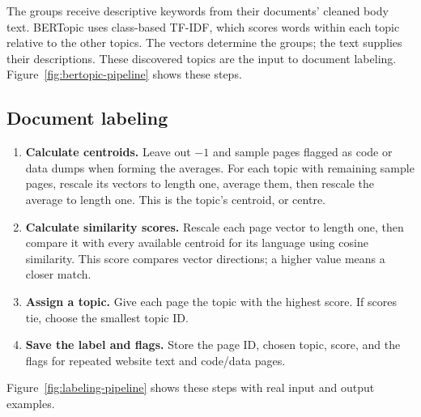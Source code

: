 The groups receive descriptive keywords from their documents' cleaned body text. BERTopic
uses class-based TF-IDF, which scores words within each topic relative to the other topics.
The vectors determine the groups; the text supplies their descriptions. These discovered
topics are the input to document labeling. Figure~\ref{fig:bertopic-pipeline} shows these steps.



\clearpage
\subsection{Document labeling}
\label{sec:method-coverage}

\begin{enumerate}[leftmargin=*,itemsep=0.4em]
\item \textbf{Calculate centroids.} Leave out $-1$ and sample pages flagged as code or data
dumps when forming the averages. For each topic with remaining sample pages, rescale its
vectors to length one, average them, then rescale the average to length one. This is the
topic's centroid, or centre.
\item \textbf{Calculate similarity scores.} Rescale each page vector to length one, then
compare it with every available centroid for its language using cosine similarity.
This score compares vector directions; a higher value means a closer match.
\item \textbf{Assign a topic.} Give each page the topic with the highest score. If scores tie,
choose the smallest topic ID.
\item \textbf{Save the label and flags.} Store the page ID, chosen topic, score, and the flags
for repeated website text and code/data pages.
\end{enumerate}

Figure~\ref{fig:labeling-pipeline} shows these steps with real input and output examples.


\clearpage
